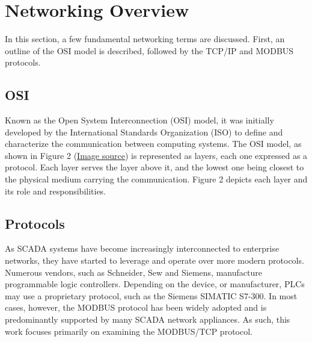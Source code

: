 \documentclass[11pt,]{article}
\begin{document}
\clearpage

\section{Networking Overview}\label{networking-overview}

In this section, a few fundamental networking terms are discussed.
First, an outline of the OSI model is described, followed by the TCP/IP
and MODBUS protocols.

\subsection{OSI}\label{osi}

Known as the Open System Interconnection (OSI) model, it was initially
developed by the International Standards Organization (ISO) to define
and characterize the communication between computing systems. The OSI
model, as shown in Figure 2
(\href{https://engineering.linkedin.com/endorsements/geographic-trends-skills-using-linkedins-endorsement-feature}{Image
source}) is represented as layers, each one expressed as a protocol.
Each layer serves the layer above it, and the lowest one being closest
to the physical medium carrying the communication. Figure 2 depicts each
layer and its role and responsibilities.

\subsection{Protocols}\label{protocols}

As SCADA systems have become increasingly interconnected to enterprise
networks, they have started to leverage and operate over more modern
protocols. Numerous vendors, such as Schneider, Sew and Siemens,
manufacture programmable logic controllers. Depending on the device, or
manufacturer, PLCs may use a proprietary protocol, such as the Siemens
SIMATIC S7-300. In most cases, however, the MODBUS protocol has been
widely adopted and is predominantly supported by many SCADA network
appliances. As such, this work focuses primarily on examining the
MODBUS/TCP protocol.
\end{document}
